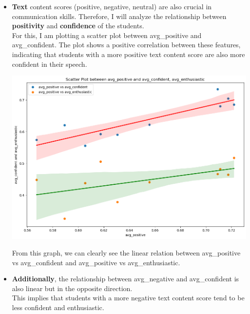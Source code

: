 \documentclass{article}
\begin{document}
\begin{itemize}
    \item \textbf{Text} content scores (positive, negative, neutral) are also crucial in communication skills. Therefore, I will analyze the relationship between \textbf{positivity} and \textbf{confidence} of the students.\\ 

    
    For this, I am plotting a scatter plot between avg\_positive and avg\_confident. The plot shows a positive correlation between these features, indicating that students with a more positive text content score are also more confident in their speech.
    \begin{center}
        \includegraphics[width=1\columnwidth]{images/scatter_plot_avgPositve_and_avg_confident_avg_enthusiatist.png}
    \end{center}
    From this graph, we can clearly see the linear relation between avg\_positive vs avg\_confident and avg\_positive vs avg\_enthusiastic. 

    \item \textbf{Additionally}, the relationship between avg\_negative and avg\_confident is also linear but in the opposite direction.\\  

    
    
    This implies that students with a more negative text content score tend to be less confident and enthusiastic. 


\end{itemize}
\end{document}
